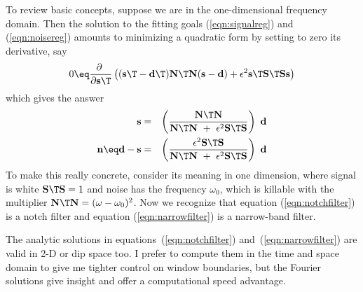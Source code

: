 \par
To review basic concepts,
suppose we are in the one-dimensional frequency domain.
Then the solution to the fitting goals
(\ref{eqn:signalreg})
and
(\ref{eqn:noisereg})
amounts to minimizing a quadratic form
by setting to zero its derivative, say
\begin{equation}
0 \eq
\frac{\partial \ }{\partial \bold s\T}
\left(
   (\bold s\T-\bold d\T)\bold N\T\bold N(\bold s - \bold d )
+ \epsilon^2 \bold s\T \bold S\T\bold S \bold s
\right)
\end{equation}
which gives the answer
\begin{eqnarray}
                                                \label{eqn:notchfilter}
\bold s &=&
                \left(
                   \frac{
                   \bold N\T \bold N
                     }{
                   \bold N\T \bold N \ + \ \epsilon^2 \bold S\T\bold S} 
                \right) \ \bold d
\\
                                                \label{eqn:narrowfilter}
\bold n \eq \bold d - \bold s
&=&
                \left(
                   \frac{\epsilon^2 \bold S\T\bold S
                     }{
                   \bold N\T \bold N \ + \ \epsilon^2 \bold S\T\bold S} 
                \right) \ \bold d
\end{eqnarray}
To make this really concrete,
consider its meaning in one dimension,
where signal is white
$\bold S\T\bold S=1$ and
noise has the frequency $\omega_0$,
which is killable with the multiplier
$\bold N\T\bold N=(\omega-\omega_0)^2$.
Now we recognize that equation (\ref{eqn:notchfilter})
is a notch filter and equation (\ref{eqn:narrowfilter})
is a narrow-band filter.
\par
The analytic solutions in equations~(\ref{eqn:notchfilter})
and~(\ref{eqn:narrowfilter})
are valid in 2-D  or dip space too.
I prefer to compute them in the time and space domain
to give me tighter control on window boundaries,
but the Fourier solutions give insight
and offer a computational speed advantage.

